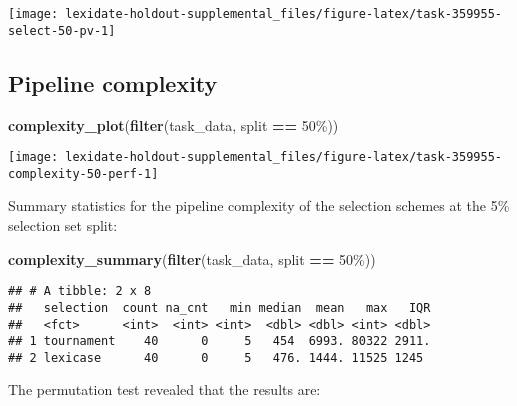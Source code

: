 \documentclass[
]{book}
\newenvironment{Shaded}{\begin{snugshade}}{\end{snugshade}}
\newcommand{\FunctionTok}[1]{\textcolor[rgb]{0.13,0.29,0.53}{\textbf{#1}}}
\newcommand{\NormalTok}[1]{#1}
\newcommand{\SpecialCharTok}[1]{\textcolor[rgb]{0.81,0.36,0.00}{\textbf{#1}}}
\newcommand{\StringTok}[1]{\textcolor[rgb]{0.31,0.60,0.02}{#1}}
\begin{document}
\texttt{[image: lexidate-holdout-supplemental\_files/figure-latex/task-359955-select-50-pv-1]}

\hypertarget{pipeline-complexity-12}{%
\subsection{Pipeline complexity}\label{pipeline-complexity-12}}

\begin{Shaded}
\begin{Highlighting}[]
\FunctionTok{complexity\_plot}\NormalTok{(}\FunctionTok{filter}\NormalTok{(task\_data, split }\SpecialCharTok{==} \StringTok{\textquotesingle{}50\%\textquotesingle{}}\NormalTok{))}
\end{Highlighting}
\end{Shaded}

\texttt{[image: lexidate-holdout-supplemental\_files/figure-latex/task-359955-complexity-50-perf-1]}

Summary statistics for the pipeline complexity of the selection schemes at the 5\% selection set split:

\begin{Shaded}
\begin{Highlighting}[]
\FunctionTok{complexity\_summary}\NormalTok{(}\FunctionTok{filter}\NormalTok{(task\_data, split }\SpecialCharTok{==} \StringTok{\textquotesingle{}50\%\textquotesingle{}}\NormalTok{))}
\end{Highlighting}
\end{Shaded}

\begin{verbatim}
## # A tibble: 2 x 8
##   selection  count na_cnt   min median  mean   max   IQR
##   <fct>      <int>  <int> <int>  <dbl> <dbl> <int> <dbl>
## 1 tournament    40      0     5   454  6993. 80322 2911.
## 2 lexicase      40      0     5   476. 1444. 11525 1245
\end{verbatim}

The permutation test revealed that the results are:
\end{document}
